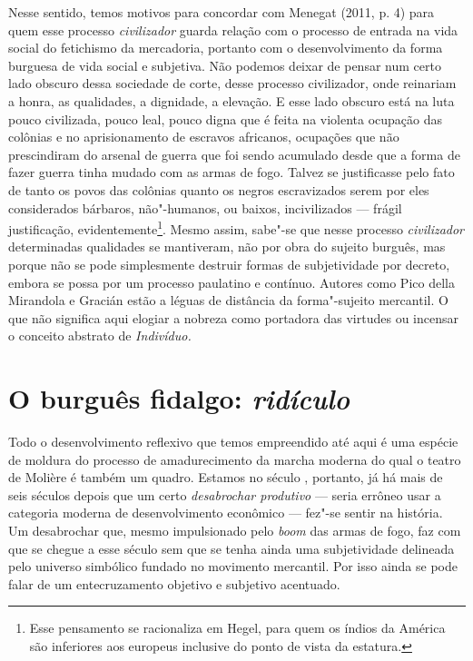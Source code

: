 Nesse sentido, temos motivos para concordar com Menegat (2011, p. 4)
para quem esse processo \emph{civilizador} guarda relação com o processo
de entrada na vida social do fetichismo da mercadoria, portanto com o
desenvolvimento da forma burguesa de vida social e subjetiva. Não
podemos deixar de pensar num certo lado obscuro dessa sociedade de
corte, desse processo civilizador, onde reinariam a honra, as
qualidades, a dignidade, a elevação. E esse lado obscuro está na luta
pouco civilizada, pouco leal, pouco digna que é feita na violenta
ocupação das colônias e no aprisionamento de escravos africanos,
ocupações que não prescindiram do arsenal de guerra que foi sendo
acumulado desde que a forma de fazer guerra tinha mudado com as armas de
fogo. Talvez se justificasse pelo fato de tanto os povos das colônias
quanto os negros escravizados serem por eles considerados bárbaros,
não"-humanos, ou baixos, incivilizados --- frágil justificação,
evidentemente\footnote{Esse pensamento se racionaliza em Hegel, para
quem os índios da América são inferiores aos europeus inclusive do
ponto de vista da estatura.}. Mesmo assim, sabe"-se que nesse processo
\emph{civilizador} determinadas qualidades se mantiveram, não por obra
do sujeito burguês, mas porque não se pode simplesmente destruir formas
de subjetividade por decreto, embora se possa por um processo paulatino
e contínuo. Autores como Pico della Mirandola e Gracián estão a léguas
de distância da forma"-sujeito mercantil. O que não significa aqui
elogiar a nobreza como portadora das virtudes ou incensar o conceito
abstrato de \emph{Indivíduo.}

\section{O burguês fidalgo: \emph{ridículo}}

Todo o desenvolvimento reflexivo que temos empreendido até aqui é uma
espécie de moldura do processo de amadurecimento da marcha moderna do
qual o teatro de Molière é também um quadro. Estamos no século ,
portanto, já há mais de seis séculos depois que um certo
\emph{desabrochar produtivo} --- seria errôneo usar a categoria moderna
de desenvolvimento econômico --- fez"-se sentir na história. Um
desabrochar que, mesmo impulsionado pelo \emph{boom} das armas de fogo,
faz com que se chegue a esse século sem que se tenha ainda uma
subjetividade delineada pelo universo simbólico fundado no movimento
mercantil. Por isso ainda se pode falar de um entecruzamento objetivo e
subjetivo acentuado.


